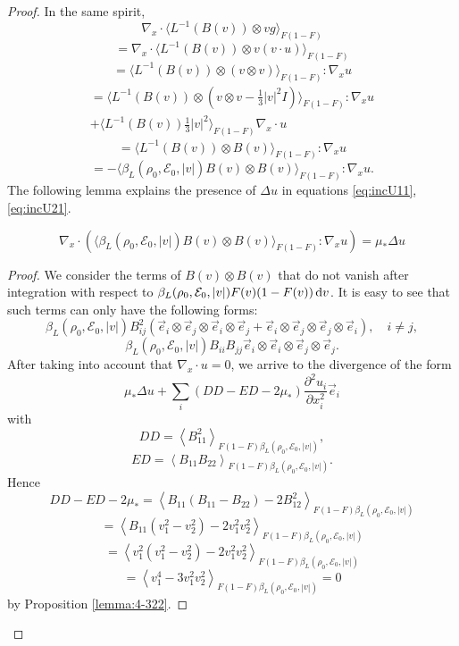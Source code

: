 \begin{proof}
In the same spirit, 
\[\nabla_x \cdot\langle   L^{-1}(B(v))\otimes vg \rangle_{F(1-F)}
 \]
\[ =\nabla_x \cdot\langle   L^{-1}(B(v))\otimes v(v\cdot u)  
\rangle_{F(1-F)}  \]
\[ = \langle   L^{-1}(B(v))\otimes (v\otimes v) 
\rangle_{F(1-F)}  :\nabla_x u\]
\[  \begin{split}=\langle   L^{-1}(B(v))\otimes (v\otimes v-\frac 13 |v|^2I) 
\rangle_{F(1-F)}  :\nabla_x u\\+   \langle   L^{-1}(B(v))
 \frac 13 |v|^2 
\rangle_{F(1-F)}  \nabla_x\cdot u\end{split}\]
\[ = \langle   L^{-1}(B(v))\otimes B(v)
\rangle_{F(1-F)}  :\nabla_x u \]\[=-\langle \beta_L(\rho_0,\mathcal E_0,|v|) B(v) \otimes B(v)
\rangle_{F(1-F)}  :\nabla_x u.\]
The following lemma explains the presence of  $\Delta u$ in equations
 \eqref{eq:incU11}, \eqref{eq:incU21}.
\begin{lemma}
 \[\nabla_x\cdot\left(\langle \beta_L(\rho_0,\mathcal E_0,|v|) B(v) \otimes B(v)
\rangle_{F(1-F)}  :\nabla_x u\right)=\mu_\ast\Delta u\]
\end{lemma}
\begin{proof}
We consider the terms of $B(v)\otimes B(v)$ that do not vanish after integration with respect to $\beta_L(\rho_0,\mathcal E_0,|v|)F(v)(1-F(v)){\,\mathrm{d} v}$. It is easy to see that
 such terms can only have the following forms:
\[\beta_L(\rho_0,\mathcal E_0,|v|)B_{ij}^2(\vec e_i\otimes\vec e_j\otimes\vec e_i\otimes\vec e_j+
\vec e_i\otimes\vec e_j\otimes\vec e_j\otimes\vec e_i),\quad i\ne j,\]
\[\beta_L(\rho_0,\mathcal E_0,|v|)B_{ii} B_{jj} \vec e_i\otimes\vec e_i\otimes\vec e_j\otimes\vec e_j. \]
After taking into account that $\nabla_x\cdot u =0$, we arrive to the divergence of the form
\[\mu_\ast\Delta u +\sum_i(DD-ED-2\mu_\ast)\frac{\partial^2 u_i}{\partial x_i^2}\vec e_i\]
with
\[DD = \left\langle  B_{11}^2
\right\rangle_{F(1-F)\beta_L(\rho_0,\mathcal E_0,|v|)},\]
\[ ED = \left\langle  B_{11}B_{22}
\right\rangle_{F(1-F)\beta_L(\rho_0,\mathcal E_0,|v|)}.\]
Hence
\[DD-ED-2\mu_\ast= \left\langle B_{11}(B_{11}-B_{22})-2B_{12}^2
\right\rangle_{F(1-F)\beta_L(\rho_0,\mathcal E_0,|v|)}\]
\[=\left\langle B_{11}(v_{1}^2-v_{2 }^2)-2v_{1 }^2v_{2 }^2
\right\rangle_{F(1-F)\beta_L(\rho_0,\mathcal E_0,|v|)}\]
\[=\left\langle v_{1 }^2 (v_{1}^2-v_{2 }^2)-2v_{1 }^2v_{2 }^2
\right\rangle_{F(1-F)\beta_L(\rho_0,\mathcal E_0,|v|)}\]
\[=\left\langle   v_{1}^4-3v_1^2v_{2 }^2 
\right\rangle_{F(1-F)\beta_L(\rho_0,\mathcal E_0,|v|)}=0\]
by Proposition \ref{lemma:4-322}.
\end{proof}
\begin{proposition}

\end{proposition}
\end{proof}
